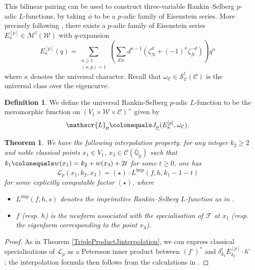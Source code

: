 \documentclass[10pt, oneside]{amsart}
\newcommand{\defeq}{\colonequals}
\numberwithin{equation}{subsection}
\newtheorem{theorem}[equation]{Theorem}
\theoremstyle{definition}
\newtheorem{definition}[equation]{Definition}
\theoremstyle{remark}
\newcommand{\opn}[1]{\operatorname{#1}}
\begin{document}
This bilinear pairing can be used to construct three-variable Rankin--Selberg $p$-adic $L$-functions, by taking $\phi$ to be a $p$-adic family of Eisenstein series. More precisely following \cite[Lemma 3.2]{LoefflerRSNote}, there exists a $p$-adic family of Eisenstein series $E^{[p]}_{\kappa} \in \mathcal{M}^\dagger(\mathcal{W})$ with $q$-expansion
\[
E^{[p]}_{\kappa}(q) = \sum_{\substack{n \geq 1 \\ (n, p) = 1}} \left( \sum_{d | n} d^{\kappa - 1} (\zeta_N^d + (-1)^{\kappa} \zeta_N^{-d} ) \right) q^n
\]
where $\kappa$ denotes the universal character. Recall that $\omega_{\mathcal{C}} \in \mathcal{S}^\dagger_\mathcal{C}(\mathcal{C})$ is the universal class over the eigencurve.

\begin{definition}
We define the universal Rankin-Selberg $p$-adic $L$-function to be the meromorphic function on $(V_1 \times \mathcal{W} \times \mathcal{C})^+$ given by
\[ \mathscr{L}_p \defeq J_{\underline{\mu}}(E^{[p]}_{\kappa}, \omega_\mathcal{C}). \]
\end{definition}

\begin{theorem} \label{RankinSelberginterpolation}
We have the following interpolation property: for any integer $k_2 \geq 2$ and noble classical points $x_1 \in V_1$, $x_3 \in \mathcal{C}(\overline{\mathbb{Q}}_p)$ such that $k_1 \defeq w(x_1) = k_2 + w(x_3) + 2t$ for some $t \geq 0$, one has
\[ 
\mathscr{L}_p(x_1, k_2, x_3) = (\star) \cdot L^{\opn{imp}}(f, h, k_1 - 1 - t)
\]
for some explicitly computable factor $(\star)$, where 
\begin{itemize}
    \item $L^{\opn{imp}}(f, h, s)$ denotes the imprimitive Rankin--Selberg $L$-function as in \cite[Definition 2.1]{LoefflerRSNote}.
    \item $f$ (resp. $h$) is the newform associated with the specialisation of $\mathcal{F}$ at $x_1$ (resp. the eigenform corresponding to the point $x_3$).
\end{itemize}
\end{theorem}

\begin{proof}
As in Theorem \ref{TripleProductJinterpolation}, we can express classical specialisations of $\mathscr{L}_p$ as a Petersson inner product between $(f^{\circ})^*$ and $\delta_{k_2}^t E^{[p]}_{k_2} \cdot h^{\circ}$; the interpolation formula then follows from the calculations in \cite{LoefflerRSNote}.
\end{proof}
\end{document}
